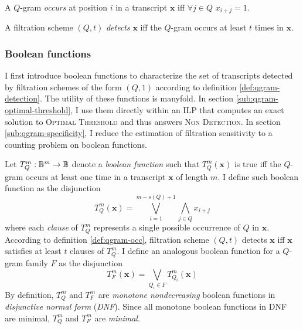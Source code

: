 \begin{definition}
\label{def:qgram-occ}
A $Q$-gram \emph{occurs} at position $i$ in a transcript $\mathbf{x}$ iff $\forall j \in Q$ $x_{i+j}=1$.
\end{definition}

\begin{definition}
\label{def:qgram-detection}
A filtration scheme $(Q,t)$ \emph{detects} $\mathbf{x}$ iff the $Q$-gram occurs at least $t$ times in $\mathbf{x}$.
\end{definition}

\subsubsection{Boolean functions}

I first introduce boolean functions to characterize the set of transcripts detected by filtration schemes of the form $(Q,1)$ according to definition \ref{def:qgram-detection}.
The utility of these functions is manyfold.
In section \ref{sub:qgram-optimal-threshold}, I use them directly within an ILP that computes an exact solution to \textsc{Optimal Threshold} and thus answers \textsc{Non Detection}.
In section \ref{sub:qgram-specificity}, I reduce the estimation of filtration sensitivity to a counting problem on boolean functions.

Let $T_{Q}^{m}: \mathbb {B}^m \rightarrow \mathbb {B}$ denote a \emph{boolean function} such that $T_{Q}^{m}(\mathbf{x})$ is true iff the $Q$-gram occurs at least one time in a transcript $\mathbf{x}$ of length $m$.
I define such boolean function as the disjunction
\begin{equation}
\label{eq:qgram-bool}
T_{Q}^{m}(\mathbf{x}) = \bigvee_{i=1}^{m-s(Q)+1} \bigwedge_{j \in Q} x_{i+j}
\end{equation}
where each \emph{clause} of $T_{Q}^{m}$ represents a single possible occurrence of $Q$ in $\mathbf{x}$.
According to definition \ref{def:qgram-occ}, filtration scheme $(Q,t)$ detects $\mathbf{x}$ iff $\mathbf{x}$ satisfies at least $t$ clauses of $T_{Q}^{m}$.
I define an analogous boolean function for a $Q$-gram family $F$ as the disjunction
\begin{equation}
\label{eq:family-bool}
T_{F}^{m}(\mathbf{x}) = \bigvee_{Q_i \in F} T_{Q_i}^{m}(\mathbf{x})
\end{equation}
By definition, $T_{Q}^{m}$ and $T_{F}^{m}$ are \emph{monotone nondecreasing} boolean functions in \emph{disjunctive normal form} (\emph{DNF}).
Since all monotone boolean functions in DNF are minimal, $T_{Q}^{m}$ and $T_{F}^{m}$ are \emph{minimal}.

